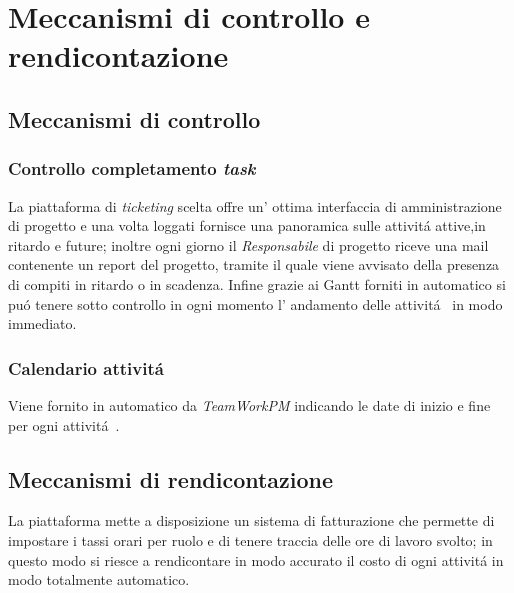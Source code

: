\section{Meccanismi di controllo e rendicontazione}
\subsection{Meccanismi di controllo}
\subsubsection{Controllo completamento \textit{task}}
La piattaforma di \textit{ticketing} scelta offre un' ottima interfaccia di amministrazione di progetto e una volta loggati fornisce una panoramica sulle attivit\'a attive,in ritardo e future; inoltre ogni giorno il \textit{Responsabile} di progetto riceve una mail contenente un report del progetto, tramite il quale viene avvisato della presenza di compiti in ritardo o in scadenza. Infine grazie ai Gantt forniti in automatico si pu\'o tenere sotto controllo in ogni momento l' andamento delle attivit\'a~ in modo immediato.
\subsubsection{Calendario attivit\'a}
Viene fornito in automatico da \textit{TeamWorkPM} indicando le date di inizio e fine per ogni attivit\'a~.
\subsection{Meccanismi di rendicontazione}
La piattaforma mette a disposizione un sistema di fatturazione che permette di impostare i tassi orari per ruolo e di tenere traccia delle ore di lavoro svolto; in questo modo si riesce a rendicontare in modo accurato il costo di ogni attivit\'a in modo totalmente automatico.